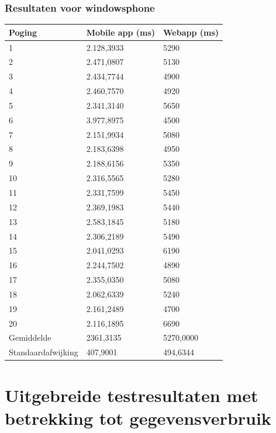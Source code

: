 \documentclass[pdftex,a4paper,12pt,twoside]{report}
\begin{document}
\subsection{Resultaten voor windowsphone}
\begin{center}
  \begin{tabular}{ | l | l | l |}
      \hline
      Poging & Mobile app (ms) & Webapp (ms)
      \\ \hline
      1 & 2.128,3933 & 5290
      \\ \hline
      2 & 2.471,0807 & 5130
      \\ \hline
      3 & 2.434,7744 & 4900
      \\ \hline
      4 & 2.460,7570 & 4920
      \\ \hline
      5 & 2.341,3140 & 5650
      \\ \hline
      6 & 3.977,8975 & 4500
      \\ \hline
      7 & 2.151,9934 & 5080
      \\ \hline
      8 & 2.183,6398 & 4950
      \\ \hline
      9 & 2.188,6156 & 5350
      \\ \hline
      10 & 2.316,5565 & 5280
      \\ \hline
      11 & 2.331,7599 & 5450
      \\ \hline
      12 & 2.369,1983 & 5440
      \\ \hline
      13 & 2.583,1845 & 5180
      \\ \hline
      14 & 2.306,2189 & 5490
      \\ \hline
      15 & 2.041,0293 & 6190
      \\ \hline
      16 & 2.244,7502 & 4890
      \\ \hline
      17 & 2.355,0350 & 5080
      \\ \hline
      18 & 2.062,6339& 5240
      \\ \hline
      19 & 2.161,2489 & 4700
      \\ \hline
      20 & 2.116,1895 & 6690
      \\ \hline
      Gemiddelde & 2361,3135 & 5270,0000
      \\ \hline
      Standaardafwijking & 407,9001 & 494,6344
      \\ \hline
   \end{tabular}
\end{center}
\chapter{Uitgebreide testresultaten met betrekking tot gegevensverbruik}
\end{document}

